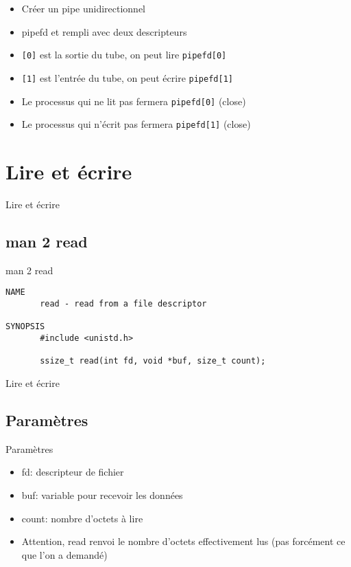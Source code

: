 \begin{frame}{\sectitle}
\begin{block}{\subsectitle}
\begin{itemize}
    \item Créer un pipe unidirectionnel 
    \item pipefd et rempli avec deux descripteurs
    \item \texttt{[0]} est la sortie du tube, on peut lire \texttt{pipefd[0]}
    \item \texttt{[1]} est l'entrée du tube, on peut écrire \texttt{pipefd[1]}
    \item Le processus qui ne lit pas fermera \texttt{pipefd[0]} (close)
    \item Le processus qui n'écrit pas fermera \texttt{pipefd[1]} (close)
\end{itemize}
\end{block}
\end{frame}

\def\sectitle{Lire et écrire}
\section{\sectitle}
\begin{frame}[containsverbatim]{\sectitle}
\def\subsectitle{man 2 read}
\subsection{\subsectitle}
\begin{block}{\subsectitle}
\begin{verbatim}
NAME
       read - read from a file descriptor

SYNOPSIS
       #include <unistd.h>

       ssize_t read(int fd, void *buf, size_t count);

\end{verbatim}
\end{block}
\end{frame}

\begin{frame}{\sectitle}
\def\subsectitle{Paramètres}
\subsection{\subsectitle}
\begin{block}{\subsectitle}
\begin{itemize}
    \item fd: descripteur de fichier
    \item buf: variable pour recevoir les données
    \item count: nombre d'octets à lire
    \item Attention, read renvoi le nombre d'octets effectivement lus (pas
    forcément ce que l'on a demandé)
\end{itemize}
\end{block}
\end{frame}


